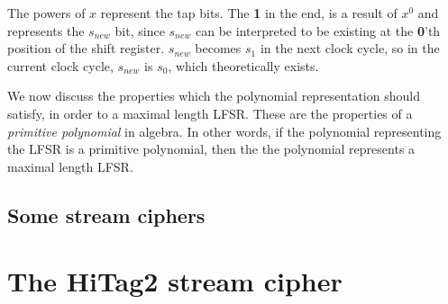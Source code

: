 The powers of $x$ represent the tap bits. The \textbf{1} in the end, is a result of $x^0$ and represents the $s_{new}$ bit, since $s_{new}$ can be interpreted to be existing at the \textbf{0}'th position of the shift register. $s_{new}$ becomes $s_1$ in the next clock cycle, so in the current clock cycle, $s_{new}$ is $s_0$, which theoretically exists.

We now discuss the properties which the polynomial representation should satisfy, in order to  a maximal length LFSR. These are the properties of a \textit{primitive polynomial} in algebra. In other words, if the polynomial representing the LFSR is a primitive polynomial, then the the polynomial represents a maximal length LFSR. 


\subsection{Some stream ciphers}

\section{The HiTag2 stream cipher}



